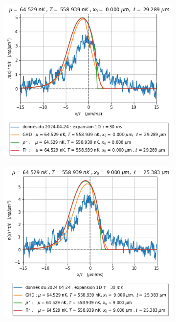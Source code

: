 \documentclass[a3, 10pt,twoside]{article}          %
\theoremstyle{plain}
\theoremstyle{definition}
\theoremstyle{remark}
\theoremstyle{definition} %
\begin{document}
	\begin{figure}[H]
    \begin{subfigure}[b]{0.32\textwidth}
        \centering
        \includegraphics[width=\textwidth]{Figures/simul_expansion_30_expansion_0}
        \caption{}
        \label{}
    \end{subfigure}
    \hfill
    \begin{subfigure}[b]{0.32\textwidth}
        \centering
        \includegraphics[width=\textwidth]{Figures/simul_expansion_30_expansion_09}

\end{subfigure}
\end{figure}
\end{document}
